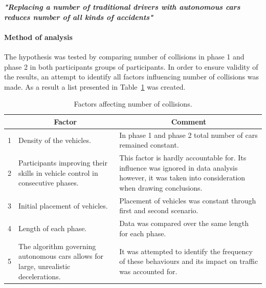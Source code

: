 \documentclass[11pt,english]{article}
\begin{document}
\textbf{\textit{"Replacing a number of traditional drivers with autonomous cars reduces number of all kinds of accidents"}}

\paragraph{Method of analysis}

The hypothesis was tested by comparing number of collisions in phase 1 and phase 2 in both participants groups of participants. In order to ensure validity of the results, an attempt to identify all factors influencing number of collisions was made. As a result a list presented in Table~\ref{table:hypothesis1} was created.


\begin{table}[]
\centering
\begin{tabular}{|c|p{6.2cm}|p{6.2cm}|}
\hline
\textbf{} & \multicolumn{1}{c|}{\textbf{Factor}}                                                 & \multicolumn{1}{c|}{\textbf{Comment}}                                                                                                                \\ \hline
1         & Density of the vehicles.                                                             & In phase 1 and phase 2 total number of cars remained constant.                                                                                       \\ \hline
2         & Participants improving their skills in vehicle control in consecutive phases.        & This factor is hardly accountable for. Its influence was ignored in data analysis however, it was taken into consideration when drawing conclusions. \\ \hline
3         & Initial placement of vehicles.                                                       & Placement of vehicles was constant through first and second scenario.                                                                                \\ \hline
4         & Length of each phase.                                                                & Data was compared over the same length for each phase.                                                                                               \\ \hline
5         & The algorithm governing autonomous cars allows for large, unrealistic decelerations. & It was attempted to identify the frequency of these behaviours and its impact on traffic was accounted for.                                          \\ \hline
\end{tabular}
\caption{Factors affecting number of collisions.}
\label{table:hypothesis1}
\end{table}
\end{document}
